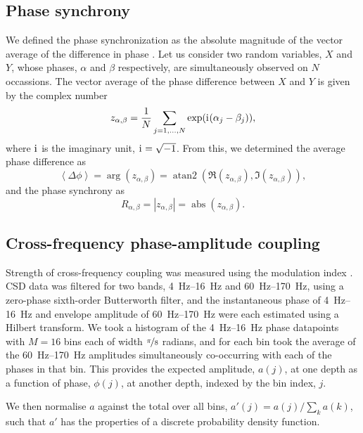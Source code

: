 \subsection{Phase synchrony}

We defined the phase synchronization as the absolute magnitude of the vector average of the difference in phase \citep{Kreuz2011}.
Let us consider two random variables, $X$ and $Y$, whose phases, $\alpha$ and $\beta$ respectively, are simultaneously observed on $N$ occassions.
The vector average of the phase difference between $X$ and $Y$ is given by the complex number
\begin{equation}
z_{\alpha, \beta} = \frac{1}{N} \sum_{j = 1, \ldots, N} \exp({\mathrm{i}\mkern1mu} (\alpha_j - \beta_j))
,\end{equation}
where ${\mathrm{i}\mkern1mu}$ is the imaginary unit, ${\mathrm{i}\mkern1mu} = \sqrt{-1}$.
From this, we determined the average phase difference as
\begin{equation}
\left<\Delta\phi\right> = \arg(z_{\alpha, \beta}) = \operatorname{atan2}(\Re(z_{\alpha, \beta}), \Im(z_{\alpha, \beta}))
,\end{equation}
and the phase synchrony as
\begin{equation}
R_{\alpha, \beta} = |z_{\alpha, \beta}| = \operatorname{abs}(z_{\alpha, \beta})
.\end{equation}


\subsection{Cross-frequency phase-amplitude coupling}
\label{sec:lam_cfc_method}

Strength of cross-frequency coupling was measured using the modulation index \citep{Tort2010}.
\ac{CSD} data was filtered for two bands, \SIrange{4}{16}{Hz} and \SIrange{60}{170}{Hz}, using a zero-phase sixth-order Butterworth filter, and the instantaneous phase of \SIrange{4}{16}{Hz} and envelope amplitude of \SIrange{60}{170}{Hz} were each estimated using a Hilbert transform.
We took a histogram of the \SIrange{4}{16}{Hz} phase datapoints with $M = 16$ bins each of width $\nicefrac{\pi}{8}$ radians, and for each bin took the average of the \SIrange{60}{170}{Hz} amplitudes simultaneously co-occurring with each of the phases in that bin.
This provides the expected amplitude, $a(j)$, at one depth as a function of phase, $\phi(j)$, at another depth, indexed by the bin index, $j$.

We then normalise $a$ against the total over all bins, $a'(j) = a(j) / \sum_k a(k)$,
such that $a'$ has the properties of a discrete probability density function.

